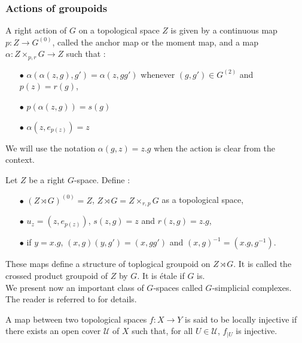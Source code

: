 \subsubsection{Actions of groupoids}

\begin{definition}
A right action of $G$ on a topological space $Z$ is given by a continuous map $p : Z \rightarrow G^{(0)}$, called the anchor map or the moment map, and a map $\alpha : Z\times_{p,r} G \rightarrow Z $ such that :
\begin{itemize}
\item[$\bullet$] $\alpha(\alpha(z,g),g') = \alpha(z, gg')$ whenever $(g,g')\in G^{(2)}$ and $p(z)=r(g)$,
\item[$\bullet$] $p(\alpha(z,g))= s(g)$
\item[$\bullet$] $\alpha(z,e_{p(z)})=z$
\end{itemize} We will use the notation $\alpha(g,z) = z.g$ when the action is clear from the context.\\ 
\end{definition}

Let $Z$ be a right $G$-space. Define :
\begin{itemize}
\item[$\bullet$] $(Z\rtimes G)^{(0)} = Z$, $Z\rtimes G = Z\times_{r,p} G$ as a topological space,
\item[$\bullet$] $u_{z}= (z,e_{p(z)})$, $ s(z,g) = z$ and $r(z,g)=z.g$, 
\item[$\bullet$] if $y = x.g$, $(x,g)(y,g')= (x,gg') $ and $(x,g)^{-1} = (x.g,g^{-1})$.
\end{itemize}

These maps define a structure of toplogical groupoid on $Z\rtimes G$. It is called the crossed product groupoid of $Z$ by $G$. It is étale if $G$ is.\\

We present now an important class of $G$-spaces called $G$-simplicial complexes. The reader is referred to \cite{TuBC2} for details. 

\begin{definition}
A map between two topological spaces $f : X\rightarrow Y$ is said to be locally injective if there exists an open cover $\mathcal U$ of $X$ such that, for all $U\in \mathcal U$, $f_{|U}$ is injective.
\end{definition}

